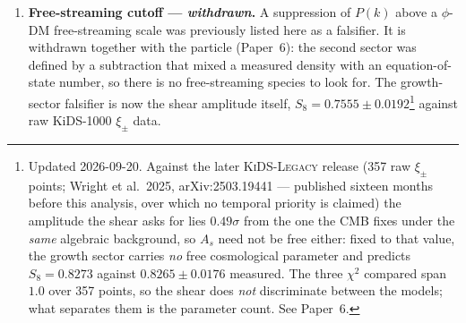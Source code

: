 \documentclass[12pt,a4paper]{article}
\begin{document}
\begin{enumerate}

  \item \textbf{Free-streaming cutoff --- \emph{withdrawn}.} A suppression of
        $P(k)$ above a $\phi$-DM free-streaming scale was previously listed
        here as a falsifier. It is withdrawn together with the particle
        (Paper~6): the second sector was defined by a subtraction that mixed a
        measured density with an equation-of-state number, so there is no
        free-streaming species to look for. The growth-sector falsifier is now
        the shear amplitude itself, $S_8=0.7555\pm0.0192$\footnote{Updated 2026-09-20. Against the later \textsc{KiDS-Legacy} release (357 raw $\xi_\pm$ points; Wright et al.\ 2025, arXiv:2503.19441 --- published sixteen months before this analysis, over which no temporal priority is claimed) the amplitude the shear asks for lies $0.49\sigma$ from the one the CMB fixes under the \emph{same} algebraic background, so $A_s$ need not be free either: fixed to that value, the growth sector carries \emph{no} free cosmological parameter and predicts $S_8=0.8273$ against $0.8265\pm0.0176$ measured. The three $\chi^2$ compared span $1.0$ over 357 points, so the shear does \emph{not} discriminate between the models; what separates them is the parameter count. See Paper~6.} against raw
        KiDS-1000 $\xi_\pm$ data.


\end{enumerate}
\end{document}
